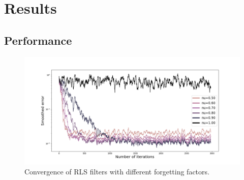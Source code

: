 \chapter{Results}

\section{Performance}

\begin{figure}[H]
    \begin{center}
        \includegraphics[width=\textwidth, keepaspectratio]{imgs/convergence.png}
        \caption{Convergence of RLS filters with different forgetting factors.}
        \label{convergence}
    \end{center}
\end{figure}